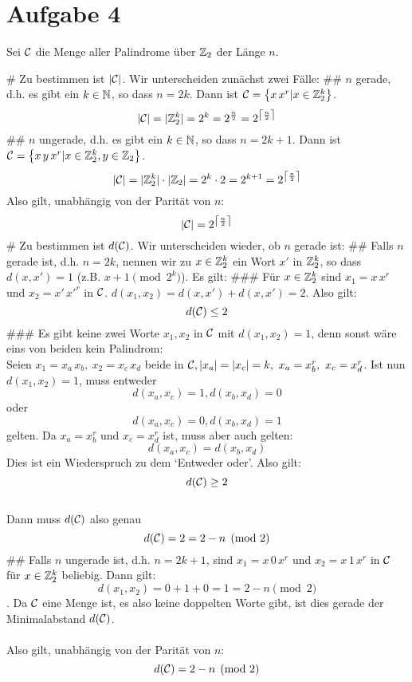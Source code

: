 \section*{Aufgabe 4}
Sei $\mathcal{C}$ die Menge aller Palindrome über $\mathbb{Z}_2$ der Länge $n$. \\
\begin{myList}
# Zu bestimmen ist $|\mathcal{C}|$. Wir unterscheiden zunächst zwei Fälle:
## $n$ gerade, d.h. es gibt ein $k\in\mathbb{N}$, so dass $n=2k$. Dann ist $\mathcal{C}=\left\lbrace x\,x^r|x\in\mathbb{Z}^k_2 \right\rbrace$.
$$|\mathcal{C}| = |\mathbb{Z}^k_2|=2^k=2^{\frac n 2}=2^{\left\lceil\frac n 2\right\rceil}$$
## $n$ ungerade, d.h. es gibt ein $k\in\mathbb{N}$, so dass $n=2k+1$. Dann ist $\mathcal{C}=\left\lbrace x\,y\,x^r|x\in\mathbb{Z}^k_2, y\in\mathbb{Z}_2 \right\rbrace$.
$$|\mathcal{C}| = |\mathbb{Z}^k_2|\cdot|\mathbb{Z}_2|=2^k\cdot 2=2^{k+1}=2^{\left\lceil\frac n 2\right\rceil}$$
Also gilt, unabhängig von der Parität von $n$:
$$|\mathcal{C}|=2^{\left\lceil\frac n 2\right\rceil}$$
# Zu bestimmen ist $d(\mathcal{C})$. Wir unterscheiden wieder, ob $n$ gerade ist:
## Falls $n$ gerade ist, d.h. $n=2k$, nennen wir zu $x\in\mathbb{Z}_2^k$ ein Wort $x'$ in $\mathbb{Z}_2^k$, so dass $d(x, x')=1$ (z.B. $x + 1\pmod {2^k}$). Es gilt:
### Für $x\in\mathbb{Z}_2^k$ sind $x_1=x\,x^r$ und $x_2=x'\,x'^r$ in $\mathcal{C}$. $d(x_1, x_2)=d(x, x')+d(x, x')=2$. Also gilt:
$$d(\mathcal{C})\leq 2$$
### Es gibt keine zwei Worte $x_1, x_2$ in $\mathcal{C}$ mit $d(x_1, x_2)=1$, denn sonst wäre eins von beiden kein Palindrom: \\
Seien $x_1=x_a\,x_b,~x_2=x_c\, x_d$ beide in $\mathcal{C}, |x_a|=|x_c|=k,~x_a=x_b^r,~x_c=x_d^r$. Ist nun $d(x_1, x_2)=1$, muss entweder $$d(x_a, x_c)=1, d(x_b, x_d)=0$$ oder $$d(x_a, x_c)=0, d(x_b, x_d)=1$$ gelten.
Da $x_a=x_b^r$ und $x_c=x_d^r$ ist, muss aber auch gelten:
$$d(x_a, x_c)=d(x_b, x_d)$$
Dies ist ein Wiederspruch zu dem `Entweder oder'. Also gilt:
$$d(\mathcal{C})\geq 2$$
\\Dann muss $d(\mathcal{C})$ also genau
$$d(\mathcal{C})=2=2-n\pmod 2$$
## Falls $n$ ungerade ist, d.h. $n=2k+1$, sind $x_1=x\,0\,x^r$ und $x_2=x\,1\,x^r$ in $\mathcal{C}$ für $x\in\mathbb{Z}_2^k$ beliebig. Dann gilt: $$d(x_1, x_2)=0+1+0=1=2-n\pmod 2$$. Da $\mathcal{C}$ eine Menge ist, es also keine doppelten Worte gibt, ist dies gerade der Minimalabstand $d(\mathcal{C})$.\\\\
Also gilt, unabhängig von der Parität von $n$:
$$d(\mathcal{C})=2-n\pmod 2$$
\end{myList}







